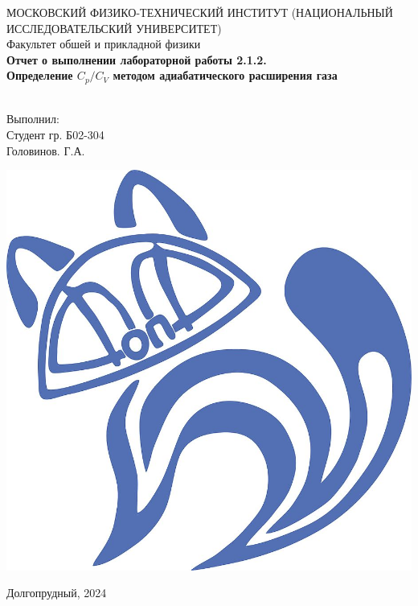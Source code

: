 \begin{titlepage}
	\begin{center}
		МОСКОВСКИЙ ФИЗИКО-ТЕХНИЧЕСКИЙ ИНСТИТУТ (НАЦИОНАЛЬНЫЙ ИССЛЕДОВАТЕЛЬСКИЙ УНИВЕРСИТЕТ) \\
		
		
		\hfill \break
		Факультет обшей и прикладной физики\\
		\vspace{2.5cm}
		\LARGE{\textbf{Отчет о выполнении лабораторной работы 2.1.2.\\ Определение $C_p/C_V$ методом адиабатического расширения газа}}\\
		\hfill \break
		\\
	\end{center}
	
	\begin{flushright}
		Выполнил:\\
		Студент гр. Б02-304\\
		Головинов. Г.А.
	\end{flushright}
	
	\vfill
	
	\begin{center}
		\includegraphics[width=0.15\linewidth]{uni}
	\end{center}
	
	
	
	
	\begin{center} Долгопрудный, 2024 \end{center}
	
	\thispagestyle{empty}
	
\end{titlepage}